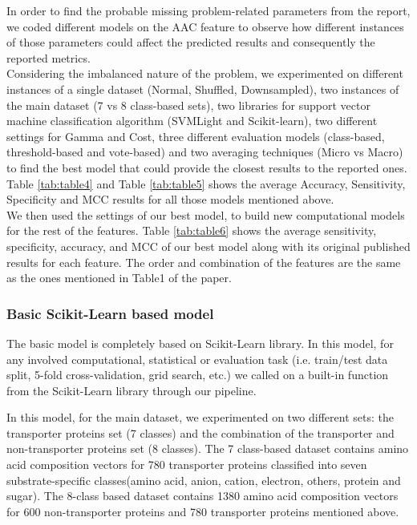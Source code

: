     In order to find the probable missing problem-related parameters from the report, 
    we coded different models on the AAC feature to observe how different instances of those 
    parameters could affect the predicted results and consequently the reported metrics.\\

    Considering the imbalanced nature of the problem, we experimented on different instances of 
    a single dataset (Normal, Shuffled, Downsampled), two instances of the main dataset (7 vs 8 class-based sets), 
    two libraries for support vector machine classification algorithm (SVMLight and Scikit-learn), two different settings 
    for Gamma and Cost, three different evaluation models (class-based, threshold-based and vote-based) and 
    two averaging techniques (Micro vs Macro) to find the best model that could provide the closest results to the reported ones. 
    Table \ref{tab:table4} and Table \ref{tab:table5} shows the average Accuracy, Sensitivity, Specificity and MCC 
    results for all those models mentioned above.\\

    We then used the settings of our best model, to build new computational models for the rest of the features. 
    Table \ref{tab:table6} shows the average sensitivity, specificity, accuracy, and MCC of our best model 
    along with its original published results for each feature. The order and combination of the features are the same 
    as the ones mentioned in Table1 of the paper.\\


    \subsubsection{Basic Scikit-Learn based model}
    The basic model is completely based on Scikit-Learn library. In this model, for any involved 
    computational, statistical or evaluation task (i.e. train/test data split, 5-fold cross-validation, grid search, etc.) 
    we called on a built-in function from the Scikit-Learn library through our pipeline.\\


    In this model, for the main dataset, we experimented on two different sets: the transporter proteins set 
    (7 classes) and the combination of the transporter and non-transporter proteins set (8 classes). 
    The 7 class-based dataset contains amino acid composition vectors for 780 transporter proteins classified into 
    seven substrate-specific classes(amino acid, anion, cation, electron, others, protein and sugar). 
    The 8-class based dataset contains 1380 amino acid composition vectors for 600 non-transporter proteins and 
    780 transporter proteins mentioned above.\\

